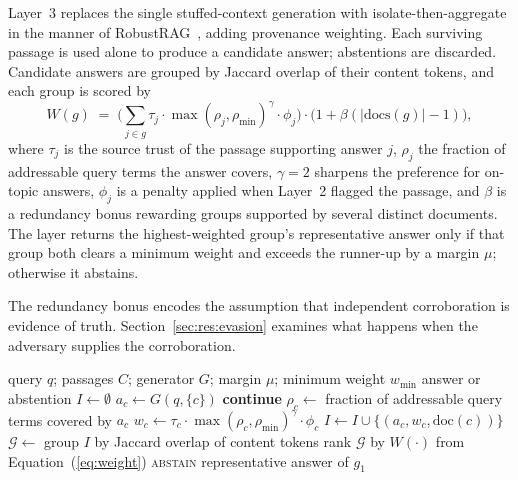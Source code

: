 Layer~3 replaces the single stuffed-context generation with isolate-then-aggregate in the
manner of RobustRAG~\citep{xiang2024robustrag}, adding provenance weighting. Each surviving
passage is used alone to produce a candidate answer; abstentions are discarded. Candidate
answers are grouped by Jaccard overlap of their content tokens, and each group is scored by
\begin{equation}
W(g) \;=\; \Big(\textstyle\sum_{j \in g} \tau_j \cdot \max(\rho_j, \rho_{\min})^{\gamma} \cdot \phi_j\Big)
\cdot \big(1 + \beta \left(|\mathrm{docs}(g)| - 1\right)\big),
\label{eq:weight}
\end{equation}
where $\tau_j$ is the source trust of the passage supporting answer $j$, $\rho_j$ the fraction
of addressable query terms the answer covers, $\gamma = 2$ sharpens the preference for
on-topic answers, $\phi_j$ is a penalty applied when Layer~2 flagged the passage, and $\beta$
is a redundancy bonus rewarding groups supported by several distinct documents. The layer
returns the highest-weighted group's representative answer only if that group both clears a
minimum weight and exceeds the runner-up by a margin $\mu$; otherwise it abstains.

The redundancy bonus encodes the assumption that independent corroboration is evidence of
truth. Section~\ref{sec:res:evasion} examines what happens when the adversary supplies the
corroboration.

\begin{algorithm}[H]
\caption{Layer 3: isolate-then-aggregate with provenance weighting}
\label{alg:l3}
\begin{algorithmic}[1]
\Require query $q$; passages $C$; generator $G$; margin $\mu$; minimum weight $w_{\min}$
\Ensure answer or abstention
\State $I \gets \emptyset$
  \State $a_c \gets G(q, \{c\})$ 
   \State \textbf{continue} \EndIf
  \State $\rho_c \gets$ fraction of addressable query terms covered by $a_c$
  \State $w_c \gets \tau_c \cdot \max(\rho_c, \rho_{\min})^{\gamma} \cdot \phi_c$
  \State $I \gets I \cup \{(a_c, w_c, \mathrm{doc}(c))\}$
\EndFor
\State $\mathcal{G} \gets$ group $I$ by Jaccard overlap of content tokens
\State rank $\mathcal{G}$ by $W(\cdot)$ from Equation~(\ref{eq:weight})
  \State \Return \textsc{abstain} 
\EndIf
\State \Return representative answer of $g_1$
\end{algorithmic}
\end{algorithm}

